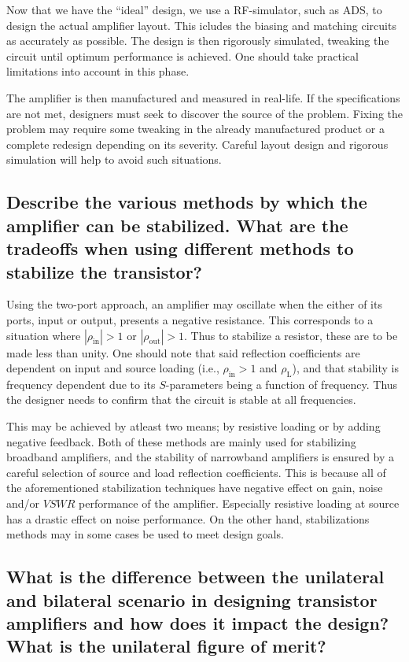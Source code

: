 \documentclass[a4paper, 12pt]{article}
\begin{document}
Now that we have the ``ideal'' design, we use a RF-simulator, such as ADS, to design the 
actual amplifier layout. This icludes the biasing and matching circuits as accurately 
as possible. The design is then rigorously simulated, tweaking the circuit until optimum 
performance is achieved. One should take practical limitations into account in this phase.

The amplifier is then manufactured and measured in real-life. If the specifications are 
not met, designers must seek to discover the source of the problem. Fixing the problem may 
require some tweaking in the already manufactured product or a complete redesign depending 
on its severity. Careful layout design and rigorous simulation will help to avoid such 
situations.


\subsection{Describe the various methods by which the amplifier can be stabilized. 
	What are the tradeoffs when using different methods to stabilize the transistor?}
\label{s:ts}

Using the two-port approach, an amplifier may oscillate when the either of its ports, 
input or output, presents a negative resistance. This corresponds to a situation where 
$|\rho_\mathrm{in}| > 1$ or $|\rho_\mathrm{out}| > 1$. Thus to stabilize a resistor, 
these are to be made less than unity. One should note that said reflection coefficients 
are dependent on input and source loading (i.e., $\rho_\mathrm{in} > 1$ and $\rho_\mathrm{L}$), 
and that stability is frequency dependent due to its $S$-parameters being a function 
of frequency. Thus the designer needs to confirm that the circuit is stable at all 
frequencies.

This may be achieved by atleast two means; by resistive loading or by adding negative 
feedback. Both of these methods are mainly used for stabilizing broadband amplifiers, 
and the stability of narrowband amplifiers is ensured by a careful selection of source 
and load reflection coefficients. This is because all of the aforementioned stabilization 
techniques have negative effect on gain, noise and/or $\mathit{VSWR}$ performance of the
amplifier. Especially resistive loading at source has a drastic effect on noise performance. 
On the other hand, stabilizations methods may in some cases be used to meet design goals.


\subsection{What is the difference between the unilateral and bilateral scenario in 
	designing transistor amplifiers	and how does it impact the design? 
	What is the unilateral figure of merit?}
\end{document}
